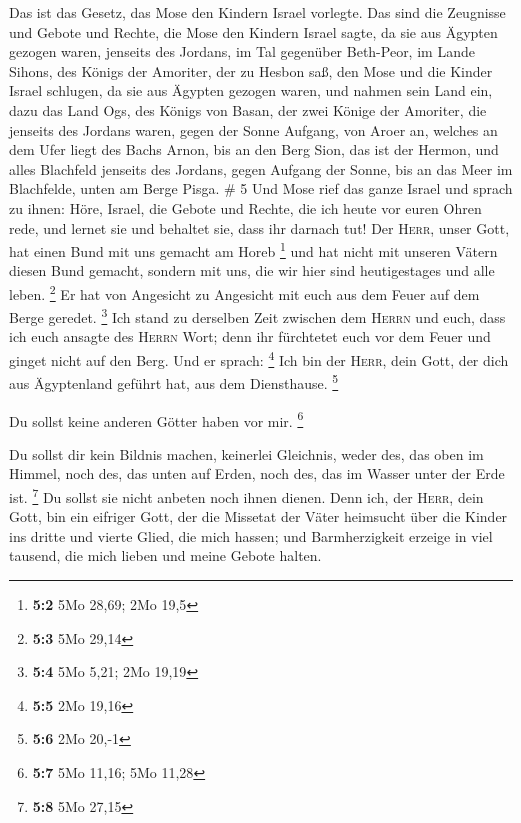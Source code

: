  Das ist das Gesetz, das Mose den Kindern Israel
vorlegte.  Das sind die Zeugnisse und Gebote und Rechte,
die Mose den Kindern Israel sagte, da sie aus Ägypten gezogen waren,
 jenseits des Jordans, im Tal gegenüber Beth-Peor, im
Lande Sihons, des Königs der Amoriter, der zu Hesbon saß, den Mose und
die Kinder Israel schlugen, da sie aus Ägypten gezogen waren,
 und nahmen sein Land ein, dazu das Land Ogs, des Königs
von Basan, der zwei Könige der Amoriter, die jenseits des Jordans waren,
gegen der Sonne Aufgang,  von Aroer an, welches an dem
Ufer liegt des Bachs Arnon, bis an den Berg Sion, das ist der Hermon,
 und alles Blachfeld jenseits des Jordans, gegen Aufgang
der Sonne, bis an das Meer im Blachfelde, unten am Berge Pisga. \# 5
 Und Mose rief das ganze Israel und sprach zu ihnen: Höre,
Israel, die Gebote und Rechte, die ich heute vor euren Ohren rede, und
lernet sie und behaltet sie, dass ihr darnach tut!  Der
\textsc{Herr}, unser Gott, hat einen Bund mit uns gemacht am Horeb
\footnote{\textbf{5:2} 5Mo 28,69; 2Mo 19,5}  und hat nicht
mit unseren Vätern diesen Bund gemacht, sondern mit uns, die wir hier
sind heutigestages und alle leben. \footnote{\textbf{5:3} 5Mo 29,14}
 Er hat von Angesicht zu Angesicht mit euch aus dem Feuer
auf dem Berge geredet. \footnote{\textbf{5:4} 5Mo 5,21; 2Mo 19,19}
 Ich stand zu derselben Zeit zwischen dem \textsc{Herrn}
und euch, dass ich euch ansagte des \textsc{Herrn} Wort; denn ihr
fürchtetet euch vor dem Feuer und ginget nicht auf den Berg. Und er
sprach: \footnote{\textbf{5:5} 2Mo 19,16}  Ich bin der
\textsc{Herr}, dein Gott, der dich aus Ägyptenland geführt hat, aus dem
Diensthause. \footnote{\textbf{5:6} 2Mo 20,-1}

 Du sollst keine anderen Götter haben vor mir. \footnote{\textbf{5:7}
  5Mo 11,16; 5Mo 11,28}

 Du sollst dir kein Bildnis machen, keinerlei Gleichnis,
weder des, das oben im Himmel, noch des, das unten auf Erden, noch des,
das im Wasser unter der Erde ist. \footnote{\textbf{5:8} 5Mo 27,15}
 Du sollst sie nicht anbeten noch ihnen dienen. Denn ich,
der \textsc{Herr}, dein Gott, bin ein eifriger Gott, der die Missetat
der Väter heimsucht über die Kinder ins dritte und vierte Glied, die
mich hassen;  und Barmherzigkeit erzeige in viel tausend,
die mich lieben und meine Gebote halten.

